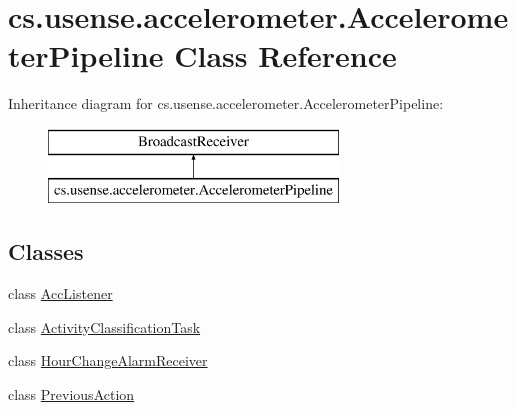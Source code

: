 \hypertarget{classcs_1_1usense_1_1accelerometer_1_1_accelerometer_pipeline}{}\section{cs.\+usense.\+accelerometer.\+Accelerometer\+Pipeline Class Reference}
\label{classcs_1_1usense_1_1accelerometer_1_1_accelerometer_pipeline}
Inheritance diagram for cs.\+usense.\+accelerometer.\+Accelerometer\+Pipeline\+:\begin{figure}[H]
\begin{center}
\leavevmode
\includegraphics[height=2.000000cm]{classcs_1_1usense_1_1accelerometer_1_1_accelerometer_pipeline}
\end{center}
\end{figure}
\subsection*{Classes}
\begin{DoxyCompactItemize}
\item 
class \hyperlink{classcs_1_1usense_1_1accelerometer_1_1_accelerometer_pipeline_1_1_acc_listener}{Acc\+Listener}
\item 
class \hyperlink{classcs_1_1usense_1_1accelerometer_1_1_accelerometer_pipeline_1_1_activity_classification_task}{Activity\+Classification\+Task}
\item 
class \hyperlink{classcs_1_1usense_1_1accelerometer_1_1_accelerometer_pipeline_1_1_hour_change_alarm_receiver}{Hour\+Change\+Alarm\+Receiver}
\item 
class \hyperlink{classcs_1_1usense_1_1accelerometer_1_1_accelerometer_pipeline_1_1_previous_action}{Previous\+Action}
\end{DoxyCompactItemize}
